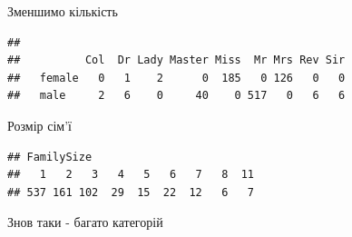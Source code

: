 \documentclass[ignorenonframetext,]{beamer}
\newenvironment{Shaded}{\begin{snugshade}}{\end{snugshade}}
\newcommand{\DecValTok}[1]{\textcolor[rgb]{0.00,0.00,0.81}{#1}}
\newcommand{\KeywordTok}[1]{\textcolor[rgb]{0.13,0.29,0.53}{\textbf{#1}}}
\newcommand{\NormalTok}[1]{#1}
\newcommand{\OperatorTok}[1]{\textcolor[rgb]{0.81,0.36,0.00}{\textbf{#1}}}
\newcommand{\StringTok}[1]{\textcolor[rgb]{0.31,0.60,0.02}{#1}}
\begin{document}
\begin{frame}[fragile]{Зменшимо кількість}
\protect\hypertarget{ux437ux43cux435ux43dux448ux438ux43cux43e-ux43aux456ux43bux44cux43aux456ux441ux442ux44c}{}

\begin{Shaded}
\end{Shaded}

\begin{verbatim}
##         
##          Col  Dr Lady Master Miss  Mr Mrs Rev Sir
##   female   0   1    2      0  185   0 126   0   0
##   male     2   6    0     40    0 517   0   6   6
\end{verbatim}

\end{frame}

\begin{frame}[fragile]{Розмір сім'ї}
\protect\hypertarget{ux440ux43eux437ux43cux456ux440-ux441ux456ux43cux457}{}

\begin{Shaded}
\end{Shaded}

\begin{verbatim}
## FamilySize
##   1   2   3   4   5   6   7   8  11 
## 537 161 102  29  15  22  12   6   7
\end{verbatim}

Знов таки - багато категорій

\end{frame}
\end{document}
